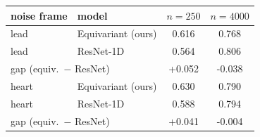 \begin{tabular}{llcc}
\toprule
noise frame & model & $n=250$ & $n=4000$ \\
\midrule
  lead & Equivariant (ours) & 0.616 & 0.768 \\
  lead & ResNet-1D & 0.564 & 0.806 \\
  \multicolumn{2}{l}{\quad gap (equiv.\ $-$ ResNet)} & +0.052 & -0.038 \\
  \midrule
  heart & Equivariant (ours) & 0.630 & 0.790 \\
  heart & ResNet-1D & 0.588 & 0.794 \\
  \multicolumn{2}{l}{\quad gap (equiv.\ $-$ ResNet)} & +0.041 & -0.004 \\
\bottomrule
\end{tabular}